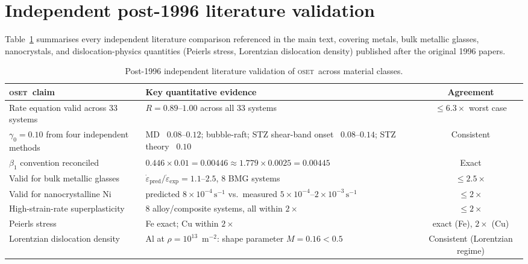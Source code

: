 \documentclass[11pt]{article}
\newcommand{\OSET}{\textsc{oset}}
\newcommand{\g}{\gamma_0}
\begin{document}
\section{Independent post-1996 literature validation}
\label{si:post1996}

Table~\ref{si:tab:post1996} summarises every independent literature
comparison referenced in the main text, covering metals, bulk metallic
glasses, nanocrystals, and dislocation-physics quantities (Peierls
stress, Lorentzian dislocation density) published after the original
1996 papers.

\begin{table}[htbp]
\centering
\caption{Post-1996 independent literature validation of \OSET\ across
material classes.}
\label{si:tab:post1996}
\renewcommand{\arraystretch}{1.35}
\begin{tabular}{p{3.6cm}p{4.6cm}c}
\toprule
\OSET\ claim & Key quantitative evidence & Agreement\\
\midrule
Rate equation valid across 33 systems~\citep{S_sripathi2014} & $R=0.89$--$1.00$ across all 33 systems & $\le6.3\times$ worst case\\
$\g=0.10$ from four independent methods & MD~\citep{S_wolf1990} $0.08$--$0.12$; bubble-raft; STZ shear-band onset~\citep{S_argon1979} $0.08$--$0.14$; STZ theory~\citep{S_falklanger1998} $0.10$ & Consistent\\
$\beta_1$ convention reconciled~\citep{S_sripathi2014} & $0.446\times0.01=0.00446\approx1.779\times0.0025=0.00445$ & Exact\\
Valid for bulk metallic glasses~\citep{S_buenz2015} & $\dot\varepsilon_\text{pred}/\dot\varepsilon_\text{exp}=1.1$--$2.5$, 8 BMG systems & $\le2.5\times$\\
Valid for nanocrystalline Ni~\citep{S_pad2018} & predicted $8\times10^{-4}\,\mathrm{s}^{-1}$ vs.\ measured $5\times10^{-4}$--$2\times10^{-3}\,\mathrm{s}^{-1}$ & $\le2\times$\\
High-strain-rate superplasticity~\citep{S_padbasariya2009} & 8 alloy/composite systems, all within $2\times$ & $\le2\times$\\
Peierls stress~\citep{S_nabarro1997} & Fe exact; Cu within $2\times$ & exact (Fe), $2\times$ (Cu)\\
Lorentzian dislocation density~\citep{S_vermeulen1995} & Al at $\rho=10^{13}$~m$^{-2}$: shape parameter $M=0.16<0.5$ & Consistent (Lorentzian regime)\\
\bottomrule
\end{tabular}
\renewcommand{\arraystretch}{1}
\end{table}
\end{document}
